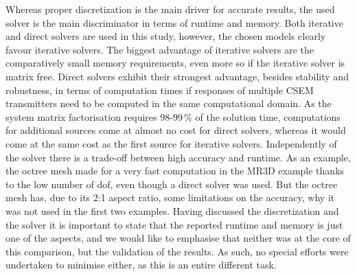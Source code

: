 \documentclass[
    paper,
  ]{geophysics}
\begin{document}
Whereas proper discretization is the main driver for accurate results, the used solver is the main discriminator in terms of runtime and memory. Both iterative and direct solvers are used in this study, however, the chosen models clearly favour iterative solvers. The biggest advantage of iterative solvers are the comparatively small memory requirements, even more so if the iterative solver is matrix free. Direct solvers exhibit their strongest advantage, besides stability and robustness, in terms of computation times if responses of multiple CSEM transmitters need to be computed in the same computational domain. As the system matrix factorisation requires 98-99\,\% of the solution time, computations for additional sources come at almost no cost for direct solvers, whereas it would come at the same cost as the first source for iterative solvers. Independently of the solver there is a trade-off between high accuracy and runtime. As an example, the octree mesh made for a very fast computation in the MR3D example thanks to the low number of dof, even though a direct solver was used. But the octree mesh has, due to its 2:1 aspect ratio, some limitations on the accuracy, why it was not used in the first two examples. Having discussed the discretization and the solver it is important to state that the reported runtime and memory is just one of the aspects, and we would like to emphasise that neither was at the core of this comparison, but the validation of the results. As such, no special efforts were undertaken to minimise either, as this is an entire different task.
\end{document}
